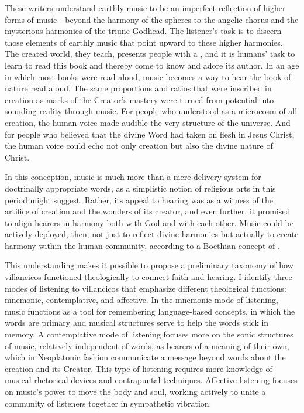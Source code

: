 \documentclass{vcbook-proposal}
\begin{document}
These writers understand earthly music to be an imperfect reflection of higher 
forms of music---beyond the harmony of the spheres to the angelic chorus and 
the mysterious harmonies of the triune Godhead. 
The listener's task is to discern those elements of earthly music that point 
upward to these higher harmonies.
The created world, they teach, presents people with a , and it is humans' task to learn to read this book and thereby come to 
know and adore its author.
In an age in which most books were read aloud, music becomes a way to hear the 
book of nature read aloud.
The same proportions and ratios that were inscribed in creation as marks of the 
Creator's mastery were turned from potential into sounding reality through 
music. 
For people who understood  as a microcosm of all creation, the 
human voice made audible the very structure of the universe.
And for people who believed that the divine Word had taken on flesh in Jesus 
Christ, the human voice could echo not only creation but also the divine nature 
of Christ.

In this conception, music is much more than a mere delivery system for 
doctrinally appropriate words, as a simplistic notion of religious arts in this 
period might suggest.
Rather, its appeal to hearing was as a witness of the artifice of creation and 
the wonders of its creator, and even further, it promised to align hearers in 
harmony both with God and with each other.
Music could be actively deployed, then, not just to reflect divine harmonies 
but actually to create harmony within the human community, according to a 
Boethian concept of .

This understanding makes it possible to propose a preliminary taxonomy of how 
villancicos functioned theologically to connect faith and hearing. 
I identify three modes of listening to villancicos that emphasize different 
theological functions: mnemonic, contemplative, and affective.
In the mnemonic mode of listening, music functions as a tool for remembering 
language-based concepts, in which the words are primary and musical structures 
serve to help the words stick in memory.
A contemplative mode of listening focuses more on the sonic structures of  
music, relatively independent of words, as bearers of a meaning of their own, 
which in Neoplatonic fashion communicate a message beyond words about the 
creation and its Creator.
This type of listening requires more knowledge of musical-rhetorical devices 
and contrapuntal techniques. 
Affective listening focuses on music's power to move the body and soul, working 
actively to unite a community of listeners together in sympathetic vibration.
\end{document}
